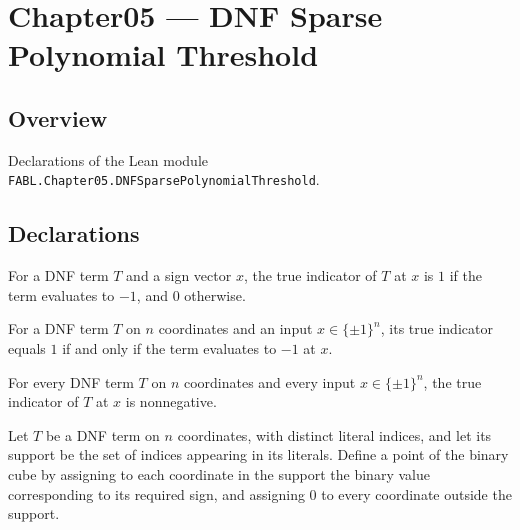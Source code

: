 \chapter{Chapter05 — DNF Sparse Polynomial Threshold}
\section{Overview}

Declarations of the Lean module \texttt{FABL.Chapter05.DNFSparsePolynomialThreshold}.

\section{Declarations}

\begin{definition}
\label{FABL.DNFTerm.trueIndicator}
\leanok
{}
For a DNF term $T$ and a sign vector $x$, the true indicator of $T$ at $x$ is $1$ if the
term evaluates to $-1$, and $0$ otherwise.
\end{definition}

\begin{theorem}
\label{FABL.DNFTerm.trueIndicator_eq_one_iff}
\leanok
{}
For a DNF term $T$ on $n$ coordinates and an input $x\in\{\pm1\}^n$, its true indicator
equals $1$ if and only if the term evaluates to $-1$ at $x$.
\end{theorem}

\begin{theorem}
\label{FABL.DNFTerm.trueIndicator_nonneg}
\leanok
{}
For every DNF term $T$ on $n$ coordinates and every input $x\in\{\pm1\}^n$, the true
indicator of $T$ at $x$ is nonnegative.
\end{theorem}

\begin{definition}
\label{FABL.DNFTerm.binaryBasePoint}
\leanok
{}
Let $T$ be a DNF term on $n$ coordinates, with distinct literal indices, and let its
support be the set of indices appearing in its literals. Define a point of the binary
cube by assigning to each coordinate in the support the binary value corresponding to
its required sign, and assigning $0$ to every coordinate outside the support.
\end{definition}

